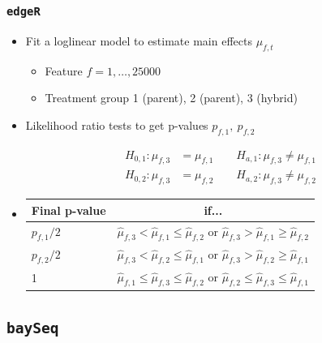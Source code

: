 \documentclass[handout]{beamer}
\providecommand{\wh}[1]{\widehat{#1}}
\numberwithin{equation}{section}
\begin{document}
\begin{frame}
\frametitle{{\tt edgeR}}

\begin{itemize}
\item Fit a loglinear model to estimate main effects $\mu_{f, t}$
\begin{itemize}
\item Feature $f = 1, \ldots, 25000$
\item Treatment group 1 (parent), 2 (parent), 3 (hybrid)
\end{itemize}
\pause \item Likelihood ratio tests to get p-values $p_{f, 1}, \ p_{f, 2}$

\begin{align*}
H_{0, 1}: \mu_{f, 3} &= \mu_{f, 1} \qquad H_{a, 1}: \mu_{f, 3} \ne \mu_{f, 1} \\
H_{0, 2}: \mu_{f, 3} &= \mu_{f, 2} \qquad H_{a, 2}: \mu_{f, 3} \ne \mu_{f, 2}
\end{align*}


\pause \item 
\begin{center}
\begin{tabular}{l|c}
Final p-value & if... \\ \hline
$p_{f, 1}/2$ & $\wh{\mu}_{f, 3} < \wh{\mu}_{f, 1} \le \wh{\mu}_{f, 2}$ or $\wh{\mu}_{f, 3} > \wh{\mu}_{f, 1} \ge \wh{\mu}_{f, 2}$ \\
$p_{f, 2}/2$ & $\wh{\mu}_{f, 3} < \wh{\mu}_{f, 2} \le \wh{\mu}_{f, 1}$ or $\wh{\mu}_{f, 3} > \wh{\mu}_{f, 2} \ge \wh{\mu}_{f, 1}$ \\
1 & $\wh{\mu}_{f, 1} \le \wh{\mu}_{f, 3} \le \wh{\mu}_{f, 2}$ or $\wh{\mu}_{f, 2} \le \wh{\mu}_{f, 3} \le \wh{\mu}_{f, 1}$
\end{tabular}
\end{center}

\end{itemize}
\end{frame}


\subsection{{\tt baySeq}}
\end{document}
